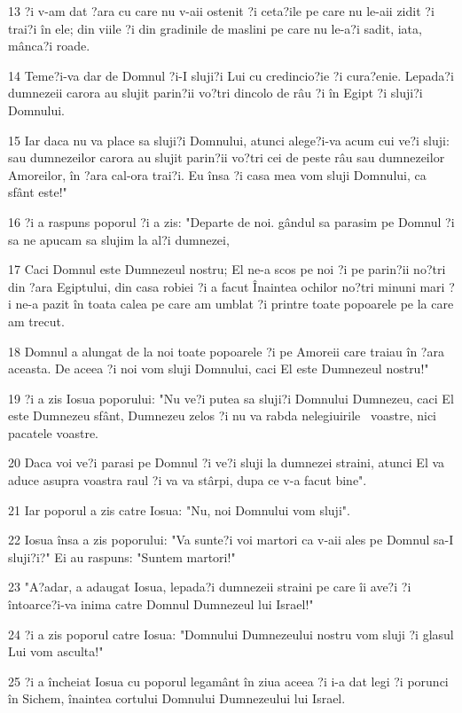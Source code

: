 \par 13 ?i v-am dat ?ara cu care nu v-aii ostenit ?i ceta?ile pe care nu le-aii zidit ?i trai?i în ele; din viile ?i din gradinile de maslini pe care nu le-a?i sadit, iata, mânca?i roade.
\par 14 Teme?i-va dar de Domnul ?i-I sluji?i Lui cu credincio?ie ?i cura?enie. Lepada?i dumnezeii carora au slujit parin?ii vo?tri dincolo de râu ?i în Egipt ?i sluji?i Domnului.
\par 15 Iar daca nu va place sa sluji?i Domnului, atunci alege?i-va acum cui ve?i sluji: sau dumnezeilor carora au slujit parin?ii vo?tri cei de peste râu sau dumnezeilor Amoreilor, în ?ara cal-ora trai?i. Eu însa ?i casa mea vom sluji Domnului, ca sfânt este!"
\par 16 ?i a raspuns poporul ?i a zis: "Departe de noi. gândul sa parasim pe Domnul ?i sa ne apucam sa slujim la al?i dumnezei,
\par 17 Caci Domnul este Dumnezeul nostru; El ne-a scos pe noi ?i pe parin?ii no?tri din ?ara Egiptului, din casa robiei ?i a facut Înaintea ochilor no?tri minuni mari ?i ne-a pazit în toata calea pe care am umblat ?i printre toate popoarele pe la care am trecut.
\par 18 Domnul a alungat de la noi toate popoarele ?i pe Amoreii care traiau în ?ara aceasta. De aceea ?i noi vom sluji Domnului, caci El este Dumnezeul nostru!"
\par 19 ?i a zis Iosua poporului: "Nu ve?i putea sa sluji?i Domnului Dumnezeu, caci El este Dumnezeu sfânt, Dumnezeu zelos ?i nu va rabda nelegiuirile  voastre, nici pacatele voastre.
\par 20 Daca voi ve?i parasi pe Domnul ?i ve?i sluji la dumnezei straini, atunci El va aduce asupra voastra raul ?i va va stârpi, dupa ce v-a facut bine".
\par 21 Iar poporul a zis catre Iosua: "Nu, noi Domnului vom sluji".
\par 22 Iosua însa a zis poporului: "Va sunte?i voi martori ca v-aii ales pe Domnul sa-I sluji?i?" Ei au raspuns: "Suntem martori!"
\par 23 "A?adar, a adaugat Iosua, lepada?i dumnezeii straini pe care îi ave?i ?i întoarce?i-va inima catre Domnul Dumnezeul lui Israel!"
\par 24 ?i a zis poporul catre Iosua: "Domnului Dumnezeului nostru vom sluji ?i glasul Lui vom asculta!"
\par 25 ?i a încheiat Iosua cu poporul legamânt în ziua aceea ?i i-a dat legi ?i porunci în Sichem, înaintea cortului Domnului Dumnezeului lui Israel.
